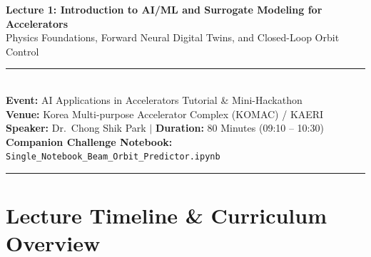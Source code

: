 \documentclass[11pt,a4paper]{article}
\begin{document}
\begin{center}
    {\LARGE\bfseries\color{primaryblue} Lecture 1: Introduction to AI/ML and Surrogate Modeling for Accelerators} \\[0.8em]
    {\large\color{darkgray} Physics Foundations, Forward Neural Digital Twins, and Closed-Loop Orbit Control} \\[0.5em]
    \rule{\textwidth}{1.2pt} \\[0.5em]
    \textbf{Event:} AI Applications in Accelerators Tutorial \& Mini-Hackathon \\
    \textbf{Venue:} Korea Multi-purpose Accelerator Complex (KOMAC) / KAERI \\
    \textbf{Speaker:} Dr.~Chong Shik Park \quad $|$ \quad \textbf{Duration:} 80 Minutes (09:10 -- 10:30) \\
    \textbf{Companion Challenge Notebook:} \texttt{Single\_Notebook\_Beam\_Orbit\_Predictor.ipynb}
\end{center}

\vspace{0.5em}

\begin{abstract}
Modern particle accelerator facilities operate with thousands of tightly coupled magnet actuators and diagnostics under sub-micron beam stability tolerances. Classical linear feedback systems face fundamental bottlenecks in non-linear regimes where magnetic core saturation and power supply limits degrade control fidelity. This lecture provides the theoretical and computational foundation bridging transverse beam dynamics, Hill's equation, and the Orbit Response Matrix (ORM) with cutting-edge supervised machine learning and reinforcement learning. We explore the design and training of neural surrogate digital twins to model cubic saturation, compare classical singular value decomposition (SVD) with model-based bounded optimization (\texttt{L-BFGS-B}), and investigate physics-informed closed-loop policy agents with adaptive damping for the afternoon Beam Orbit Alignment Mini-Hackathon.
\end{abstract}

\tableofcontents
\vspace{1em}
\hrule
\vspace{1.5em}

\section{Lecture Timeline \& Curriculum Overview}
\end{document}
